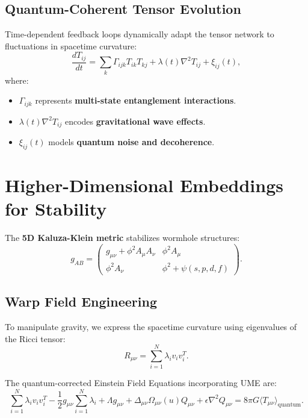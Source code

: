 \documentclass{article}
\theoremstyle{plain}
\begin{document}
\begin{itemize}
\begin{itemize}
\subsection{Quantum-Coherent Tensor Evolution}
Time-dependent feedback loops dynamically adapt the tensor network to fluctuations in spacetime curvature:
\begin{equation}
\frac{d T_{ij}}{dt} = \sum_{k} \Gamma_{ijk} T_{ik} T_{kj} + \lambda(t) \nabla^2 T_{ij} + \xi_{ij}(t),
\end{equation}
where:
\begin{itemize}
    \item $\Gamma_{ijk}$ represents \textbf{multi-state entanglement interactions}.
    \item $\lambda(t) \nabla^2 T_{ij}$ encodes \textbf{gravitational wave effects}.
    \item $\xi_{ij}(t)$ models \textbf{quantum noise and decoherence}.
\end{itemize}

\section{Higher-Dimensional Embeddings for Stability}
The \textbf{5D Kaluza-Klein metric} stabilizes wormhole structures:
\begin{equation}
g_{AB} =
\begin{pmatrix}
g_{\mu\nu} + \phi^2 A_{\mu} A_{\nu} & \phi^2 A_{\mu} \\
\phi^2 A_{\nu} & \phi^2 + \psi(s, p, d, f)
\end{pmatrix}.
\end{equation}

\subsection{Warp Field Engineering}

To manipulate gravity, we express the spacetime curvature using eigenvalues of the Ricci tensor:
\begin{equation}
R_{\mu\nu} = \sum_{i=1}^{N} \lambda_i v_i v_i^T.
\end{equation}

The quantum-corrected Einstein Field Equations incorporating UME are:
\begin{equation}
\sum_{i=1}^{N} \lambda_i v_i v_i^T - \frac{1}{2} g_{\mu\nu} \sum_{i=1}^{N} \lambda_i + \Lambda g_{\mu\nu} + \Delta_{\mu\nu} \Omega_{\mu\nu} (u) Q_{\mu\nu} + \epsilon \nabla^2 Q_{\mu\nu} = 8 \pi G \langle T_{\mu\nu} \rangle_{\text{quantum}}.
\end{equation}


\end{itemize}
\end{itemize}
\end{document}
